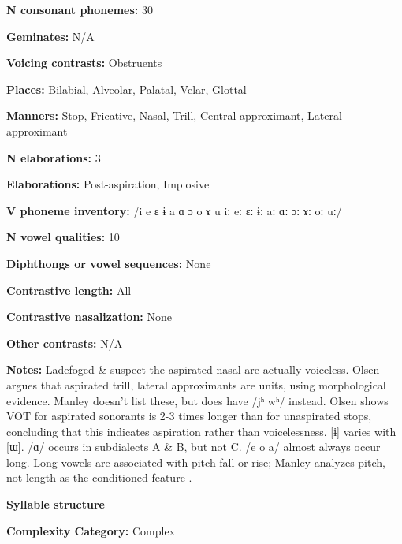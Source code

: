 \textbf{N consonant phonemes:} 30



\textbf{Geminates:} N/A



\textbf{Voicing contrasts:} Obstruents



\textbf{Places:} Bilabial, Alveolar, Palatal, Velar, Glottal



\textbf{Manners:} Stop, Fricative, Nasal, Trill, Central approximant, Lateral approximant



\textbf{N elaborations:} 3



\textbf{Elaborations:} Post-aspiration, Implosive



\textbf{V phoneme inventory:} /i e ɛ ɨ a ɑ ɔ o ɤ u iː eː ɛː ɨː aː ɑː ɔː ɤː oː uː/



\textbf{N vowel qualities:} 10



\textbf{Diphthongs or vowel sequences:} None



\textbf{Contrastive length:} All



\textbf{Contrastive nasalization:} None



\textbf{Other contrasts:} N/A



\textbf{Notes:} Ladefoged \& \citet[116]{Maddieson1996} suspect the aspirated nasal are actually voiceless. Olsen argues that aspirated trill, lateral approximants are units, using morphological evidence. Manley doesn’t list these, but does have /jʰ wʰ/ instead. Olsen shows VOT for aspirated sonorants is 2-3 times longer than for unaspirated stops, concluding that this indicates aspiration rather than voicelessness. [ɨ] varies with [ɯ]. /ɑ/ occurs in subdialects A \& B, but not C. /e o a/ almost always occur long. Long vowels are associated with pitch fall or rise; Manley analyzes pitch, not length as the conditioned feature \citep[15]{Manley1972}.



\textbf{Syllable structure}



\textbf{Complexity Category:} Complex



